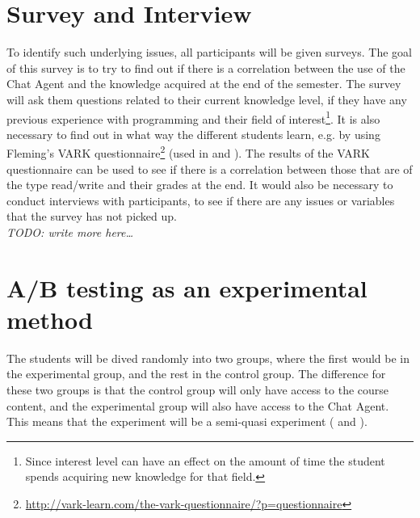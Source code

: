 \section{Survey and Interview}
\label{chapter4:survey_and_interview}
To identify such underlying issues, all participants will be given surveys. The goal of this survey is to try to find out if there is a correlation between the use of the 
Chat Agent and the knowledge acquired at the end of the semester. The survey will ask them questions related to their current knowledge level, if they have any previous 
experience with programming and their field of interest\footnote{Since interest level can have an effect on the amount of time the student spends acquiring new knowledge 
	for that field.}. It is also necessary to find out in what way the different students learn, e.g. by using Fleming's VARK 
 questionnaire\footnote{\url{http://vark-learn.com/the-vark-questionnaire/?p=questionnaire}} (used in \citet[p.~152]{Kowalski2013} and \citet{Sarabdeen2013}). 
The results of the VARK questionnaire can be used to see if there is a correlation between those that are of the type read/write and their grades at the end.
\vspace{0.5em}\newline
It would also be necessary to conduct interviews with participants, to see if there are any issues or variables that the survey has not picked up. \\
\emph{TODO: write more here\ldots}

\section{A/B testing as an experimental method}
\label{chapter4:ab_testing_experimental}
The students will be dived randomly into two groups, where the first would be in the experimental group, and the rest in the control group. The difference for these two 
groups is that the control group will only have access to the course content, and the experimental group will also have access to the Chat Agent. This means that the experiment 
will be a semi-quasi experiment (\citet[p.~226-248]{Leedy2012} and \citet[p.~114-115]{Ringdal2007}).

